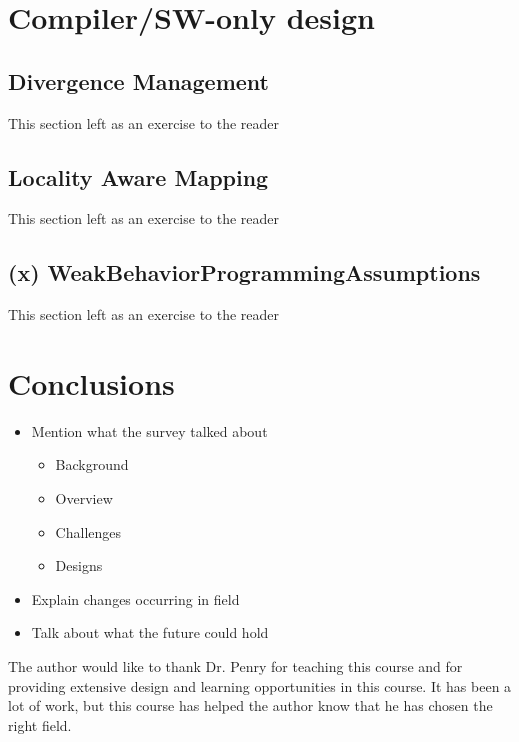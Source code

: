 \documentclass[prodmode,acmtecs]{acmsmall} %
\begin{document}
\section{Compiler/SW-only design} \label{sec:software}
\subsection{Divergence Management}
This section left as an exercise to the reader

\subsection{Locality Aware Mapping}
This section left as an exercise to the reader

\subsection{(x) WeakBehaviorProgrammingAssumptions}
This section left as an exercise to the reader

\section{Conclusions} \label{sec:conclusions}
\begin{itemize}
\item Mention what the survey talked about
  \begin{itemize}
  \item Background
  \item Overview
  \item Challenges
  \item Designs
  \end{itemize}
\item Explain changes occurring in field
\item Talk about what the future could hold
\end{itemize}

\begin{acks}
The author would like to thank Dr. Penry for teaching this course and for
providing extensive design and learning opportunities in this course. It has
been a lot of work, but this course has helped the author know that he has
chosen the right field.
\end{acks}




\end{document}
